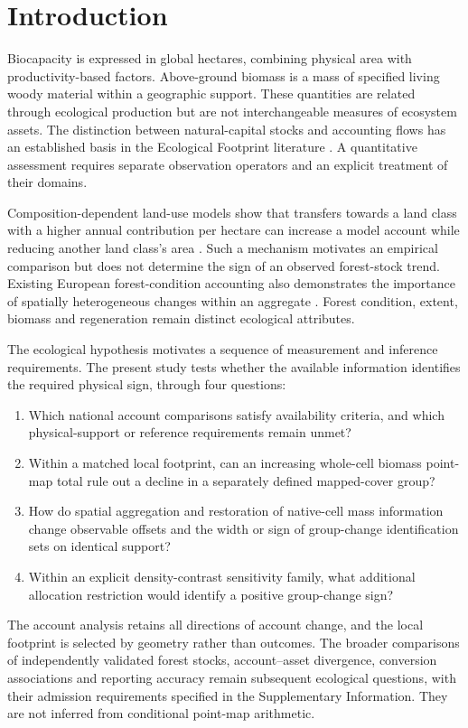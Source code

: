 \documentclass[11pt,a4paper]{article}
\begin{document}
\section{Introduction}
Biocapacity is expressed in global hectares, combining physical area with productivity-based factors. Above-ground biomass is a mass of specified living woody material within a geographic support. These quantities are related through ecological production but are not interchangeable measures of ecosystem assets. The distinction between natural-capital stocks and accounting flows has an established basis in the Ecological Footprint literature \citep{Mancini2017}. A quantitative assessment requires separate observation operators and an explicit treatment of their domains.

Composition-dependent land-use models show that transfers towards a land class with a higher annual contribution per hectare can increase a model account while reducing another land class's area \citep{Abaee2026}. Such a mechanism motivates an empirical comparison but does not determine the sign of an observed forest-stock trend. Existing European forest-condition accounting also demonstrates the importance of spatially heterogeneous changes within an aggregate \citep{Maes2023}. Forest condition, extent, biomass and regeneration remain distinct ecological attributes.

The ecological hypothesis motivates a sequence of measurement and inference requirements. The present study tests whether the available information identifies the required physical sign, through four questions:
\begin{enumerate}
\item Which national account comparisons satisfy availability criteria, and which physical-support or reference requirements remain unmet?
\item Within a matched local footprint, can an increasing whole-cell biomass point-map total rule out a decline in a separately defined mapped-cover group?
\item How do spatial aggregation and restoration of native-cell mass information change observable offsets and the width or sign of group-change identification sets on identical support?
\item Within an explicit density-contrast sensitivity family, what additional allocation restriction would identify a positive group-change sign?
\end{enumerate}
The account analysis retains all directions of account change, and the local footprint is selected by geometry rather than outcomes. The broader comparisons of independently validated forest stocks, account--asset divergence, conversion associations and reporting accuracy remain subsequent ecological questions, with their admission requirements specified in the Supplementary Information. They are not inferred from conditional point-map arithmetic.
\end{document}
